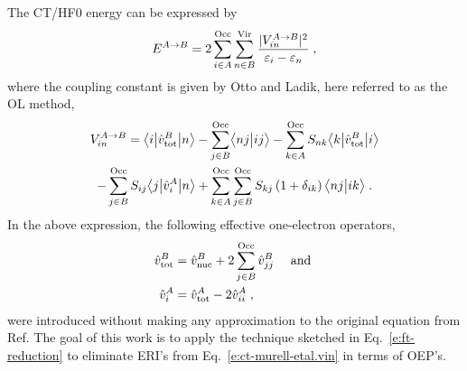 The CT/HF0 energy can be expressed
by\cite{Murrell.Randic.Williams.Longuet-Higgins.ProcRSocLondA.1965,Otto.Ladik.ChemPhys.1975}
%
\begin{equation} \label{e:ct-murell-etal.e}
 E^{A\rightarrow B} = 2 \sum_{i\in A}^{\rm Occ} \sum_{n\in B}^{\rm Vir} 
  \frac{\vert V^{A\rightarrow B}_{in} \vert^2 }{\varepsilon_i - \varepsilon_n} \;,
\end{equation}
%
%
where the coupling constant is given by Otto and Ladik,\cite{Otto.Ladik.ChemPhys.1975}
here referred to as the OL method,
%
\begin{multline} \label{e:ct-murell-etal.vin}
 V^{A\rightarrow B}_{in} = 
        \bigl\langle {i} \bigl\lvert {\hat{v}^B_{\rm tot} } \bigl\lvert {n} \bigr\rangle 
      - \sum_{j\in B}^{\rm Occ} \bigl\langle {nj} \bigl\lvert {ij} \bigr\rangle 
      - \sum_{k\in A}^{\rm Occ} S_{nk} \bigl\langle {k} \bigl\lvert {\hat{v}^B_{\rm tot} } \bigl\lvert {i} \bigr\rangle \\
      - \sum_{j\in B}^{\rm Occ} S_{ij} \bigl\langle {j} \bigl\lvert {\hat{v}^A_{i} } \bigl\lvert {n} \bigr\rangle  
     + \sum_{k\in A}^{\rm Occ} \sum_{j\in B}^{\rm Occ}  
        S_{kj} \left(1+\delta_{ik}\right) \bigl\langle {nj} \bigl\lvert {ik} \bigr\rangle \;.
\end{multline}
%
In the above expression, the following effective one\hyp{}electron operators,
%
\begin{subequations} 
\begin{align} \label{e:ct-murell-etal.vtot-vi}
 \hat{v}^B_{\rm tot} &= \hat{v}^B_{\rm nuc} + 2\sum_{j\in B}^{\rm Occ} \hat{v}^B_{jj} \quad\text{ and }\\ 
 \hat{v}^A_{i      } &= \hat{v}^A_{\rm tot} - 2\hat{v}^A_{ii} \;,
\end{align}
\end{subequations}
%
were introduced without making any approximation to the original equation
from Ref. 
The goal of this work is to apply the technique sketched in Eq.~\eqref{e:ft-reduction}
to eliminate ERI's from Eq.~\eqref{e:ct-murell-etal.vin} in terms of OEP's.

